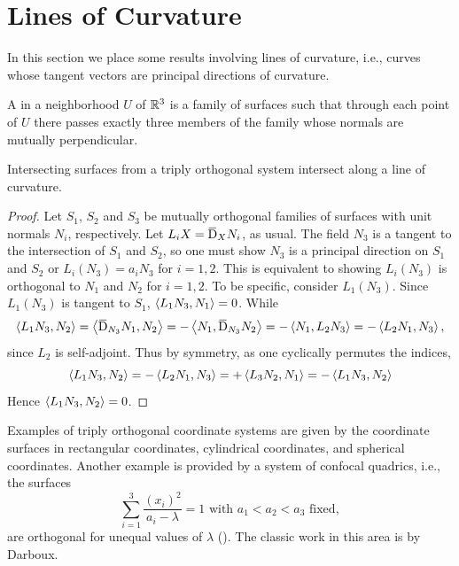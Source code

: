 \documentclass[../main]{subfiles}
\begin{document}
\section{Lines of Curvature}\label{ch03:s5}
In this section we place some results involving lines of curvature, i.e., curves whose tangent vectors are principal directions of curvature. 

\begin{definition}
A  in a neighborhood $U$ of $\mathbb{R}^3$ is a family of surfaces such that through each point of $U$ there passes exactly three members of the family whose normals are mutually perpendicular. 
\end{definition}



\begin{theorem}[Dupin] \label{thm:ch3.5.1}
Intersecting surfaces from a triply orthogonal system intersect along a line of curvature.
\end{theorem}

\begin{proof}
Let $S_1$, $S_2$ and $S_3$ be mutually orthogonal families of surfaces with unit normals $N_i$, respectively. Let $L_i X = \covariant_X N_i$, as usual. The field $N_3$ is a tangent to the intersection of $S_1$ and $S_2$, so one must show $N_3$ is a principal direction on $S_1$ and $S_2$ or $L_i(N_3) = a_i N_3$ for $i = 1, 2$. This is equivalent to showing $L_i(N_3)$ is orthogonal to $N_1$ and $N_2$ for $i = 1, 2$. To be specific, consider $L_1(N_3)$. Since $L_1(N_3)$ is tangent to $S_1$, $\left\langle L_1 N_3,N_1\right\rangle = 0$. While \[\ip {L_1 N_3} {N_2} = \ip {\covariant_{N_3} N_1} {N_2} = -\ip{N_1} {\covariant_{N_3} N_2} = -\ip {N_1} {L_2 N_3} = -\ip{L_2 N_1} {N_3},\] since $L_2$ is self-adjoint. Thus by symmetry, as one cyclically permutes the indices,
\[
\left\langle L_1 N_3,N_2\right\rangle = -\left\langle L_2 N_1,N_3\right\rangle = +\left\langle L_3 N_2,N_1\right\rangle = -\left\langle L_1 N_3,N_2\right\rangle
\]
Hence $\left\langle L_1 N_3,N_2\right\rangle = 0$.
\end{proof}



Examples of triply orthogonal coordinate systems are given by the coordinate surfaces in rectangular coordinates, cylindrical coordinates, and spherical coordinates. Another example is provided by a system of confocal quadrics, i.e., the surfaces \[\sum\limits_{i=1}^3 \dfrac{(x_i)^2}{a_i - \lambda} = 1\text{ with }a_1 < a_2 < a_3\text{ fixed},\]are orthogonal for unequal values of $\lambda$ (\cite[p.~100]{struik1961lectures}). The classic work in this area is by Darboux. 
\end{document}
